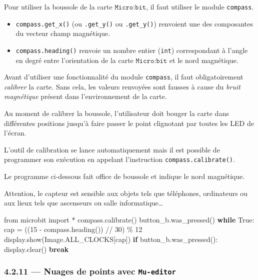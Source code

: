 \documentclass[a4paper,17pt]{extarticle}
\providecommand{\tightlist}{%
      \setlength{\itemsep}{0pt}\setlength{\parskip}{0pt}}
\newenvironment{Shaded}{}{}
\newcommand{\DecValTok}[1]{\textcolor[rgb]{0.25,0.63,0.44}{{#1}}}
\newcommand{\NormalTok}[1]{{#1}}
\newcommand{\ImportTok}[1]{{#1}}
\newcommand{\VariableTok}[1]{\textcolor[rgb]{0.10,0.09,0.49}{{#1}}}
\newcommand{\ControlFlowTok}[1]{\textcolor[rgb]{0.00,0.44,0.13}{\textbf{{#1}}}}
\newcommand{\OperatorTok}[1]{\textcolor[rgb]{0.40,0.40,0.40}{{#1}}}
\begin{document}
Pour utiliser la boussole de la carte \(\texttt{Micro:bit}\), il faut
utiliser le module \texttt{compass}.

\begin{itemize}
\tightlist
\item
  \texttt{compass.get\_x()} (ou \texttt{.get\_y()} ou
  \texttt{.get\_y()}) renvoient une des composantes du vecteur champ
  magnétique.
\item
  \texttt{compass.heading()} renvoie un nombre entier (\texttt{int})
  correspondant à l'angle en degré entre l'orientation de la carte
  \(\texttt{Micro:bit}\) et le nord magnétique.
\end{itemize}
\begin{remarque}
    Avant d'utiliser une fonctionnalité du module \texttt{compass}, il faut
obligatoirement \emph{calibrer} la carte. Sans cela, les valeurs
renvoyées sont fausses à cause du \emph{bruit magnétique} présent dans
l'environnement de la carte.

Au moment de calibrer la boussole, l'utilisateur doit bouger la carte
dans différentes positions jusqu'à faire passer le point clignotant par
toutes les LED de l'écran.

L'outil de calibration se lance automatiquement mais il est possible de
programmer son exécution en appelant l'instruction
\texttt{compass.calibrate()}.

        \end{remarque}\begin{exemple}
    Le programme ci-dessous fait office de boussole et indique le nord
magnétique.

Attention, le capteur est sensible aux objets tels que téléphones,
ordinateurs ou aux lieux tels que ascenseurs ou salle
informatique\ldots{}

\begin{Shaded}
\begin{Highlighting}[]
\ImportTok{from}\NormalTok{ microbit }\ImportTok{import} \OperatorTok{*}
\NormalTok{compass.calibrate()}
\NormalTok{button\_b.was\_pressed()}
\ControlFlowTok{while} \VariableTok{True}\NormalTok{:}
\NormalTok{    cap }\OperatorTok{=}\NormalTok{ ((}\DecValTok{15} \OperatorTok{{-}}\NormalTok{ compass.heading()) }\OperatorTok{//} \DecValTok{30}\NormalTok{) }\OperatorTok{\%} \DecValTok{12}
\NormalTok{    display.show(Image.ALL\_CLOCKS[cap])}
    \ControlFlowTok{if}\NormalTok{ button\_b.was\_pressed():}
\NormalTok{        display.clear()}
        \ControlFlowTok{break}
\end{Highlighting}
\end{Shaded}

        \end{exemple}
    \hypertarget{nuages-de-points-avec-mu-editor}{%
\subsubsection{\texorpdfstring{4.2.11 --- Nuages de points avec
\texttt{Mu-editor}}{4.2.11 --- Nuages de points avec Mu-editor}}\label{nuages-de-points-avec-mu-editor}}
\end{document}
